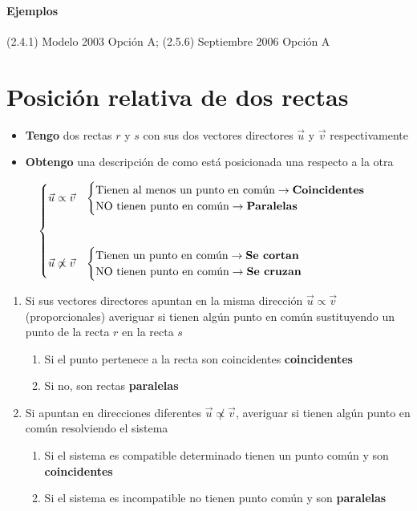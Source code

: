 \paragraph{Ejemplos} (2.4.1) Modelo 2003 Opción A; (2.5.6) Septiembre 2006 Opción A

\section{Posición relativa de dos rectas}
\begin{itemize}
\item \textbf{Tengo} dos rectas $r$ y $s$ con sus dos vectores directores $\vec{u}$ y $\vec{v}$
respectivamente
\item \textbf{Obtengo} una descripción de como está posicionada una respecto a la otra
\end{itemize}

$$
\begin{cases}
	\vec{u} \propto \vec{v} &
		\begin{cases}
			\text{Tienen al menos un punto en común} \rightarrow \text{\textbf{Coincidentes}} \\
			\text{NO tienen punto en común} \rightarrow \text{\textbf{Paralelas}}
		\end{cases} \vspace{1cm}\\
	\vec{u} \not\propto \vec{v} & 
		\begin{cases}
			\text{Tienen un punto en común} \rightarrow \text{\textbf{Se cortan}} \\
			\text{NO tienen punto en común} \rightarrow \text{\textbf{Se cruzan}}
		\end{cases} \\
\end{cases}
$$

\begin{enumerate}
	\item Si sus vectores directores apuntan en la misma dirección $\vec{u} \propto \vec{v}$
		(proporcionales) averiguar si tienen algún punto en común sustituyendo un punto de la recta
		$r$ en la recta $s$
		\begin{enumerate}
			\item Si el punto pertenece a la recta son coincidentes \textbf{coincidentes}
			\item Si no, son rectas \textbf{paralelas}
		\end{enumerate}
	\item Si apuntan en direcciones diferentes $\vec{u} \not\propto \vec{v}$, 
		averiguar si tienen algún punto en común resolviendo el sistema
		\begin{enumerate}
		\item Si el sistema es compatible determinado tienen un punto común y son
			\textbf{coincidentes}
		\item Si el sistema es incompatible no tienen punto común y son \textbf{paralelas}
		\end{enumerate}
\end{enumerate}

